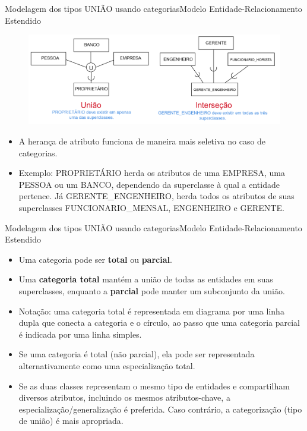\documentclass[t]{beamer}
\begin{document}
\begin{ftst}{Modelagem dos tipos UNIÃO usando categorias}{Modelo Entidade-Relacionamento Estendido}
\begin{figure}
    \centering
    \includegraphics[scale=0.12]{Figuras/02_05.png}
\end{figure}
\footnotesize
\begin{itemize}
    \item A herança de atributo funciona de maneira mais seletiva no caso de categorias. 
    \item Exemplo: PROPRIETÁRIO herda os atributos de uma EMPRESA, uma PESSOA ou um BANCO, dependendo da superclasse à qual a entidade pertence. Já GERENTE\_ENGENHEIRO, herda todos os atributos de suas superclasses FUNCIONARIO\_MENSAL, ENGENHEIRO e GERENTE.
\end{itemize}
\end{ftst}


\begin{ftst}{Modelagem dos tipos UNIÃO usando categorias}{Modelo Entidade-Relacionamento Estendido}
\begin{itemize}
    \item Uma categoria pode ser \textbf{total} ou \textbf{parcial}. 
    \item Uma \textbf{categoria total} mantém a união de todas as entidades em suas superclasses, enquanto a \textbf{parcial} pode manter um subconjunto da união. 
    \item Notação: uma categoria total é representada em diagrama por uma linha dupla que conecta a categoria e o círculo, ao passo que uma categoria parcial é indicada por uma linha simples.
    \item Se uma categoria é total (não parcial), ela pode ser
    representada alternativamente como uma especialização total.
    \item Se as duas classes representam o mesmo tipo de entidades e compartilham diversos atributos, incluindo os mesmos atributos-chave, a especialização/generalização é preferida. Caso contrário, a categorização (tipo de união) é mais apropriada.

\end{itemize}
\end{ftst}
\end{document}
